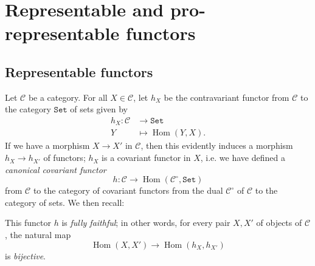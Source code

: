 \section{Representable and pro-representable functors}\label{fga3.ii-a}

\subsection{Representable functors}\label{fga3.ii-a.1}

Let $\mathcal{C}$ be a category.
For all $X\in\mathcal{C}$, let $h_X$ be the contravariant functor from $\mathcal{C}$ to the category $\mathtt{Set}$ of sets given by
\[
    \begin{aligned}
        h_X\colon \mathcal{C} & \to \mathtt{Set}
        \\Y&\mapsto \operatorname{Hom}(Y,X).
    \end{aligned}
\]
If we have a morphism $X\to X'$ in $\mathcal{C}$, then this evidently induces a morphism $h_X\to h_{X'}$ of functors;
$h_X$ is a covariant functor in $X$, i.e. we have defined a \emph{canonical covariant functor}
\[
    h\colon \mathcal{C} \to \operatorname{Hom}(\mathcal{C}^\circ,\mathtt{Set})
\]
from $\mathcal{C}$ to the category of covariant functors from the dual $\mathcal{C}^\circ$ of $\mathcal{C}$ to the category of sets.
We then recall:

\begin{proposition}\label{fga3.ii-a.1-proposition-1.1}
    This functor $h$ is \emph{fully faithful};
    in other words, for every pair $X,X'$ of objects of $\mathcal{C}$, the natural map
    \[
        \operatorname{Hom}(X,X') \to \operatorname{Hom}(h_X,h_{X'})
    \]
    is \emph{bijective}.
\end{proposition}

